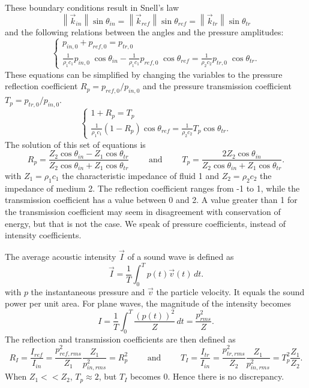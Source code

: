 These boundary conditions result in Snell's law
\[
\left\|\vec{k}_{in}\right\| \sin\theta_{in} = \left\|\vec{k}_{ref}\right\| \sin\theta_{ref} = \left\|\vec{k}_{tr}\right\| \sin\theta_{tr}
\]
and the following relations between the angles and the pressure amplitudes:
\[
\left\{
\begin{array}{l}
p_{in,0} + p_{ref,0} = p_{tr,0}\\
\frac{1 }{\rho_1 c_1}p_{in,0}\; \cos\theta_{in} - \frac{ 1}{\rho_1 c_1}p_{ref,0}\; \cos\theta_{ref} = \frac{ 1}{\rho_2 c_2}p_{tr,0}\; \cos\theta_{tr}.
\end{array}\right.
\]
These equations can be simplified by changing the variables to the pressure reflection coefficient $R_p = p_{ref,0}/p_{in,0}$ and the pressure transmission coefficient $T_p = p_{tr,0}/p_{in,0}$.  
\[
\left\{
\begin{array}{l} 
1+R_p = T_p\\ 
\frac{ 1}{\rho_1 c_1}(1-R_p ) \cos\theta_{ref} = \frac{ 1}{\rho_2 c_2}T_p  \cos\theta_{tr}.
\end{array}\right.
\]
The solution of this set of equations is
\[
R_p = \frac{Z_2 \cos \theta_{in} - Z_1 \cos \theta_{tr}}{Z_2 \cos \theta_{in} + Z_1 \cos \theta_{tr}} \qquad \textrm{ and } \qquad
T_p = \frac{2 Z_2 \cos \theta_{in} }{Z_2 \cos \theta_{in} + Z_1 \cos \theta_{tr}}.
\]
with $Z_1 = \rho_1 c_1$ the characteristic impedance of fluid 1 and $Z_2 = \rho_2 c_2$ the impedance of medium 2.  
The reflection coefficient ranges from -1 to 1, while the transmission coefficient has a value between 0 and 2. A value greater than 1 for the transmission coefficient may seem in disagreement with conservation of energy, but that is not the case. We speak of pressure coefficients, instead of intensity coefficients. 

The average acoustic intensity $\vec{I}$ of a sound wave is defined as 
\[
\vec{I} = \frac{1}{T} \int^{T}_{0}{p(t) \vec{v}(t) \,dt}.
\]
with $p$ the instantaneous pressure and $\vec{v}$ the particle velocity. It equals the sound power per unit area. For plane waves, the magnitude of the intensity becomes 
\[
I = \frac{1}{T} \int^{T}_{0}{\frac{\left(p(t)\right)^2}{Z} \,dt} = \frac{p^2_{rms}}{Z}.
\]
The reflection and transmission coefficients are then defined as
\[
R_I = \frac{I_{ref}}{I_{in}} = \frac{p^2_{ref,rms}}{Z_1} \frac{Z_1}{p^2_{in,rms}} = R_p^2 \qquad\textrm{ and } \qquad T_I = \frac{I_{tr}}{I_{in}} = \frac{p^2_{tr,rms}}{Z_2} \frac{Z_1}{p^2_{in,rms}} = T_p^2 \frac{Z_1}{Z_2}. 
\]
When $Z_1 << Z_2$, $T_p \approx 2$, but $T_I$ becomes 0. Hence there is no discrepancy.




